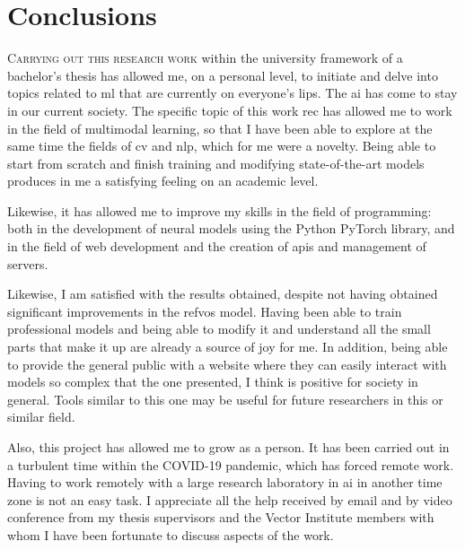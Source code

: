 

\chapter{Conclusions}\label{cha:concl}



\lettrine{C}{arrying out this research work} within the university framework of
a bachelor's thesis has allowed me, on a personal level, to initiate and delve
into topics related to \gls{ml} that are currently on everyone's lips. The
\gls{ai} has come to stay in our current society. The specific topic of this
work \gls{rec} has allowed me to work in the field of multimodal learning, so
that I have been able to explore at the same time the fields of \gls{cv} and
\gls{nlp}, which for me were a novelty. Being able to start from scratch and
finish training and modifying state-of-the-art models produces in me a
satisfying feeling on an academic level.

Likewise, it has allowed me to improve my skills in the field of programming:
both in the development of neural models using the Python PyTorch library, and
in the field of web development and the creation of \glspl{api} and management
of servers.

Likewise, I am satisfied with the results obtained, despite not having obtained
significant improvements in the \gls{refvos} model. Having been able to train
professional models and being able to modify it and understand all the small
parts that make it up are already a source of joy for me. In addition, being
able to provide the general public with a website where they can easily
interact with models so complex that the one presented, I think is positive for
society in general. Tools similar to this one may be useful for future
researchers in this or similar field.

Also, this project has allowed me to grow as a person. It has been carried out
in a turbulent time within the COVID-19 pandemic, which has forced remote
work. Having to work remotely with a large research laboratory in \gls{ai} in
another time zone is not an easy task. I appreciate all the help received by
email and by video conference from my thesis supervisors and the Vector
Institute members with whom I have been fortunate to discuss aspects of the
work.



